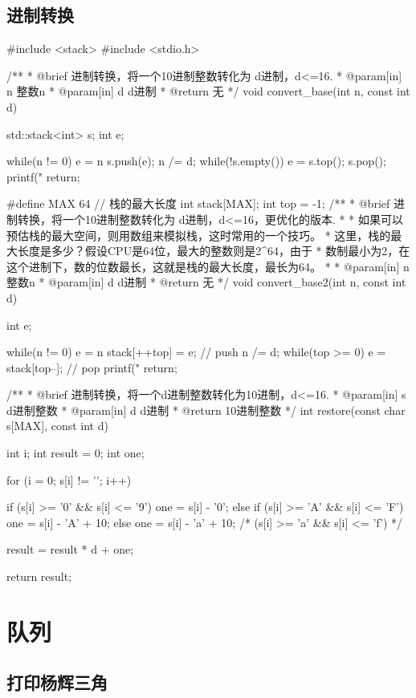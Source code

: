 \subsection{进制转换}
\begin{Codex}[label=convert_base.cpp]
#include <stack>
#include <stdio.h>

 /**
  * @brief 进制转换，将一个10进制整数转化为 d进制，d<=16.
  * @param[in] n 整数n
  * @param[in] d d进制
  * @return 无
  */
void convert_base(int n, const int d) {
    std::stack<int> s;
    int e;

    while(n != 0) {
        e = n %
        s.push(e);
        n /= d;
    }
    while(!s.empty()) {
        e = s.top();
        s.pop();
        printf("%
    }
    return;
}

#define MAX 64 // 栈的最大长度
int stack[MAX];
int top = -1;
/**
 * @brief 进制转换，将一个10进制整数转化为 d进制，d<=16，更优化的版本.
 *
 * 如果可以预估栈的最大空间，则用数组来模拟栈，这时常用的一个技巧。
 * 这里，栈的最大长度是多少？假设CPU是64位，最大的整数则是2^64，由于
 * 数制最小为2，在这个进制下，数的位数最长，这就是栈的最大长度，最长为64。
 *
 * @param[in] n 整数n
 * @param[in] d d进制
 * @return 无
 */
void convert_base2(int n, const int d) {
    int e;

    while(n != 0) {
        e = n %
        stack[++top] = e; // push
        n /= d;
    }
    while(top >= 0) {
        e = stack[top--]; // pop
        printf("%
    }
    return;
}


/**
 * @brief 进制转换，将一个d进制整数转化为10进制，d<=16.
 * @param[in] s d进制整数
 * @param[in] d d进制
 * @return 10进制整数
 */
int restore(const char s[MAX], const int d) {
    int i;
    int result = 0;
    int one;

    for (i = 0; s[i] != '\0'; i++) {
        if (s[i] >= '0' && s[i] <= '9') one = s[i] - '0';
        else if (s[i] >= 'A' && s[i] <= 'F') one = s[i] - 'A' + 10;
        else one = s[i] - 'a' + 10; /* (s[i] >= 'a' && s[i] <= 'f') */
        
        result = result * d + one;
    }
    return result;
}
\end{Codex}

\section{队列} %


\subsection{打印杨辉三角}

